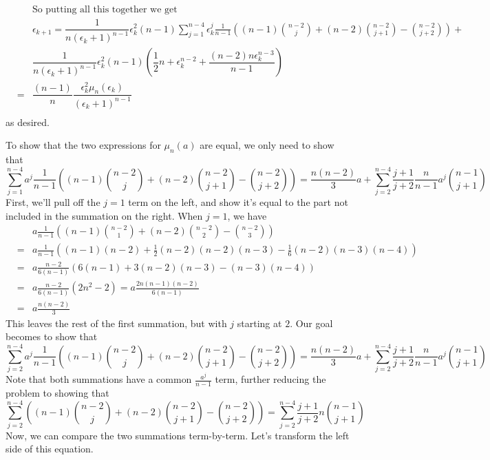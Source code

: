 \documentclass{article}
\begin{document}
\begin{eqnarray*}
&&\textrm{So putting all this together we get}\\
&&\epsilon_{k+1} = \dfrac{1}{n(\epsilon_k+1)^{n-1}} \epsilon_k^2(n-1)\sum_{j=1}^{n-4}\epsilon_k^j\frac{1}{n-1}
      \left( (n-1) \binom{n-2}{j} + (n-2)\binom{n-2}{j+1} - \binom{n-2}{j+2} \right)+ \\ 
&&\dfrac{1}{n(\epsilon_k+1)^{n-1}} \epsilon_k^2(n-1) \left( \dfrac{1}{2}n + \epsilon_k^{n-2} + \dfrac{(n-2)n \epsilon_k^{n-3}}{n-1} \right)\\
&=& \dfrac{(n-1)}{n} \dfrac{\epsilon_k^2 \mu_n (\epsilon_k)}{(\epsilon_k+1)^{n-1}}\\
\end{eqnarray*}
as desired.
\vspace{1cm}

To show that the two expressions for $\mu_n(a)$ are equal, we only need to show that 
\[ \sum_{j=1}^{n-4} a^j \frac{1}{n-1}\left( (n-1)\binom{n-2}{j} + (n-2)\binom{n-2}{j+1} - \binom{n-2}{j+2} \right) =
\frac{n(n-2)}{3}a + \sum_{j=2}^{n-4}\frac{j+1}{j+2}\frac{n}{n-1}a^j \binom{n-1}{j+1} 
\]
First, we'll pull off the $j = 1$ term on the left, and show it's equal to the part not included in the summation on the right.
When $j=1$, we have
\begin{eqnarray*}
& & a\frac{1}{n-1}\left( (n-1)\binom{n-2}{1} + (n-2)\binom{n-2}{2} - \binom{n-2}{3} \right) \\
&=&  a\frac{1}{n-1}\left( (n-1)(n-2) + \frac{1}{2}(n-2)(n-2)(n-3) - \frac{1}{6}(n-2)(n-3)(n-4) \right) \\
&=&  a\frac{n-2}{6(n-1)}\left(6(n-1) + 3(n-2)(n-3) - (n-3)(n-4) \right) \\
&=&  a\frac{n-2}{6(n-1)}(2n^2 - 2) =  a\frac{2n(n-1)(n-2)}{6(n-1)} \\
&=&  a\frac{n(n-2)}{3}
\end{eqnarray*}
This leaves the rest of the first summation, but with $j$ starting at $2$. Our goal becomes to show that
\[
\sum_{j=2}^{n-4} a^j \frac{1}{n-1}\left( (n-1)\binom{n-2}{j} + (n-2)\binom{n-2}{j+1} - \binom{n-2}{j+2} \right) 
 = \frac{n(n-2)}{3}a + \sum_{j=2}^{n-4}\frac{j+1}{j+2}\frac{n}{n-1}a^j \binom{n-1}{j+1} 
\]
Note that both summations have a common $\frac{a^j}{n-1}$ term, further reducing the problem to showing that
\[
\sum_{j=2}^{n-4} \left( (n-1)\binom{n-2}{j} + (n-2)\binom{n-2}{j+1} - \binom{n-2}{j+2} \right) 
 = \sum_{j=2}^{n-4}\frac{j+1}{j+2}n \binom{n-1}{j+1} 
\]
Now, we can compare the two summations term-by-term. Let's transform the left side of this equation.
\end{document}
